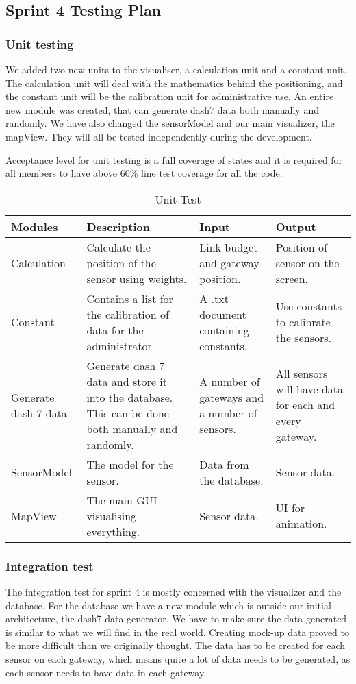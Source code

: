 \documentclass[../document]{subfiles}
\begin{document}
\subsection{Sprint 4 Testing Plan}

\subsubsection{Unit testing}
We added two new units to the visualiser, a calculation unit and a constant unit. The calculation unit will deal with the mathematics behind the positioning, and the constant unit will be the calibration unit for administrative use. An entire new module was created, that can generate dash7 data both manually and randomly. We have also changed the sensorModel and our main visualizer, the mapView. They will all be tested independently during the development. 

Acceptance level for unit testing is a full coverage of states and it is required for all members to have above 60\% line test coverage for all the code.

\begin{table}[H]
\caption{Unit Test}
\centering
\begin{tabularx}{\textwidth}{|X|X|X|X|}
	\hline
	Modules
	&Description
	&Input
	&Output
	\\ \hline Calculation
	&Calculate the position of the sensor using weights.
	&Link budget and gateway position.
	&Position of sensor on the screen.
	\\ \hline Constant
	&Contains a list for the calibration of data for the administrator
	&A .txt document containing constants.
	&Use constants to calibrate the sensors.
	\\ \hline Generate dash 7 data
	&Generate dash 7 data and store it into the database. This can be done both manually and randomly. 
	&A number of gateways and a number of sensors.
	&All sensors will have data for each and every gateway.
	\\ \hline SensorModel
	&The model for the sensor.
	&Data from the database.
	&Sensor data.
	\\ \hline MapView
	&The main GUI visualising everything.
	&Sensor data.
	&UI for animation.
	\\ \hline 
\end{tabularx}
\end{table}

\subsubsection{Integration test}
The integration test for sprint 4 is mostly concerned with the visualizer and the database. For the database we have a new module which is outside our initial architecture, the dash7 data generator. We have to make sure the data generated is similar to what we will find in the real world. Creating mock-up data proved to be more difficult than we originally thought. The data has to be created for each sensor on each gateway, which means quite a lot of data needs to be generated, as each sensor needs to have data in each gateway. 
\end{document}
